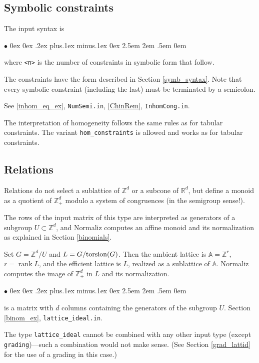 \documentclass[12pt,a4paper]{scrartcl}
\newcommand{\stdli}{ \topsep0ex \partopsep0ex %
\parsep.2ex plus.1ex minus.1ex \itemsep0ex%
\leftmargin2.5em \labelwidth2em \labelsep.5em \rightmargin0em}%
\renewenvironment{itemize}{\begin{list}{{$\bullet$}}{\stdli}}{\end{list}}
\theoremstyle{definition}
\def\ZZ{{\mathbb Z}}
\def\RR{{\mathbb R}}
\def\AA{{\mathbb A}}
\DeclareMathOperator{\rank}{rank}
\def\itemtt[#1]{\item[\textbf{\ttt{#1}}]}
\def\ttt{\texttt}
\begin{document}
\subsection{Symbolic constraints}

The input syntax is

\begin{itemize}
	\itemtt[constraints <n> symbolic] where \verb|<n>| is the number of constraints in symbolic form that follow.
\end{itemize}

The constraints have the form described in Section \ref{symb_syntax}. Note that every symbolic constraint (including the last) must be terminated by a semicolon.

See \ref{inhom_eq_ex}, \verb|NumSemi.in|, \ref{ChinRem}, \verb|InhomCong.in|.

The interpretation of homogeneity follows the same rules as for tabular constraints. The variant \verb|hom_constraints| is allowed and works as for tabular constraints.


\subsection{Relations}\label{relations}

Relations do not select a
sublattice of $\ZZ^d$ or a subcone of $\RR^d$, but define a
monoid as a quotient of $\ZZ_+^d$ modulo a system of
congruences (in the semigroup sense!).

The rows of the input matrix of this type are interpreted as
generators of a subgroup $U\subset\ZZ^d$, and Normaliz computes an affine monoid and its normalization  as explained in Section \ref{binomials}.

Set $G=\ZZ^d/U$ and $L=G/\textup{torsion}(G)$. Then the ambient lattice
is $\AA=\ZZ^r$, $r=\rank L$, and the efficient lattice is $L$, realized
as a sublattice of $\AA$. Normaliz computes the image of $\ZZ^d_+$ in $L$ and its normalization.

\begin{itemize}
	\itemtt[lattice\_ideal] is a matrix with $d$ columns containing the generators of the subgroup $U$. Section \ref{binom_ex}, \verb|lattice_ideal.in|.
\end{itemize}

The type \ttt{lattice\_ideal} cannot be combined with any other input type (except
\ttt{grading})---such a combination would not make sense. (See Section \ref{grad_lattid} for the use of a grading in this case.)
\end{document}
